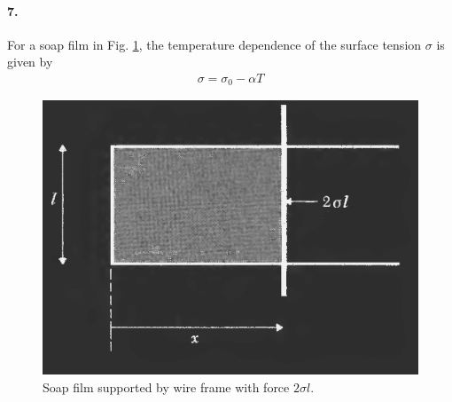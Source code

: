 \documentclass[../main.tex]{subfiles}
\begin{document}
\paragraph{7.} For a soap film in Fig. \ref{fig:soap}, the temperature dependence of the surface tension $\sigma$ is given by
\begin{align*}
    \sigma = \sigma_0 - \alpha T
\end{align*}
\begin{figure}
    \centering
    \includegraphics[width=0.6\linewidth]{hw3_7.png}
    \caption{Soap film supported by wire frame with force $2\sigma l$.}
    \label{fig:soap}
\end{figure}
\end{document}
